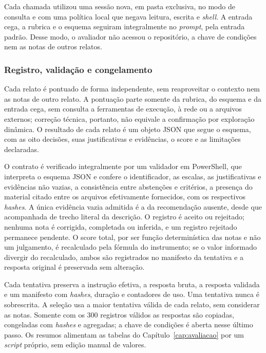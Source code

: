 Cada chamada utilizou uma sessão nova, em pasta exclusiva, no modo de consulta
e com uma política local que negava leitura, escrita e \textit{shell}. A
entrada cega, a rubrica e o esquema seguiram integralmente no \textit{prompt},
pela entrada padrão. Desse modo, o avaliador não acessou o repositório, a chave
de condições nem as notas de outros relatos.

\subsubsection{Registro, validação e congelamento}

Cada relato é pontuado de forma independente, sem reaproveitar o contexto nem as
notas de outro relato. A pontuação parte somente da rubrica, do esquema e da
entrada cega, sem consulta a ferramentas de execução, à rede ou a arquivos
externos; correção técnica, portanto, não equivale a confirmação por exploração
dinâmica. O resultado de cada relato é um objeto JSON que segue o esquema, com as
oito decisões, suas justificativas e evidências, o score e as limitações
declaradas.

O contrato é verificado integralmente por um validador em PowerShell, que
interpreta o esquema JSON e confere o identificador, as escalas, as
justificativas e evidências não vazias, a consistência entre abstenções e
critérios, a presença do material citado entre os arquivos efetivamente
fornecidos, com os respectivos \textit{hashes}. A única evidência vazia admitida
é a da recomendação ausente, desde que acompanhada de trecho literal da
descrição. O registro é aceito ou rejeitado; nenhuma nota é corrigida, completada
ou inferida, e um registro rejeitado permanece pendente. O score total, por ser
função determinística das notas e não um julgamento, é recalculado pela fórmula
do instrumento; se o valor informado divergir do recalculado, ambos são
registrados no manifesto da tentativa e a resposta original é preservada sem
alteração.

Cada tentativa preserva a instrução efetiva, a resposta bruta, a resposta
validada e um manifesto com \textit{hashes}, duração e contadores de uso. Uma
tentativa nunca é sobrescrita. A seleção usa a maior tentativa válida de cada
relato, sem considerar as notas. Somente com os 300 registros válidos as
respostas são copiadas, congeladas com \textit{hashes} e agregadas; a chave de
condições é aberta nesse último passo. Os resumos alimentam as tabelas do
Capítulo~\ref{cap:avaliacao} por um \textit{script} próprio, sem edição manual
de valores.

